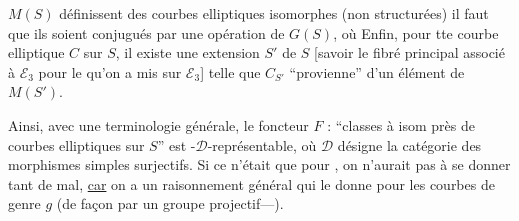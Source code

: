 
$M(S)$ définissent des courbes elliptiques isomorphes (non structurées) il faut que  ils soient conjugués par une opération de $G(S)$, où  Enfin, pour tte courbe elliptique $C$ sur $S$, il existe une extension  $S'$ de $S$ [savoir le fibré principal associé à $\mathcal E_3$ pour le  qu'on a mis sur $\mathcal E_3$] telle que  $C_{S'}$ ``provienne'' d'un élément de $M(S')$.

Ainsi, avec une terminologie générale, le foncteur $F$ : ``classes à isom près de courbes elliptiques sur $S$'' est -$\mathcal D$-représentable, où $\mathcal D$ désigne la catégorie des morphismes simples surjectifs. Si ce n'était que pour , on n'aurait pas à se donner tant de mal, \uline{car} on a un raisonnement général qui le donne pour les courbes de genre $g$  (de façon   par un groupe projectif---).
